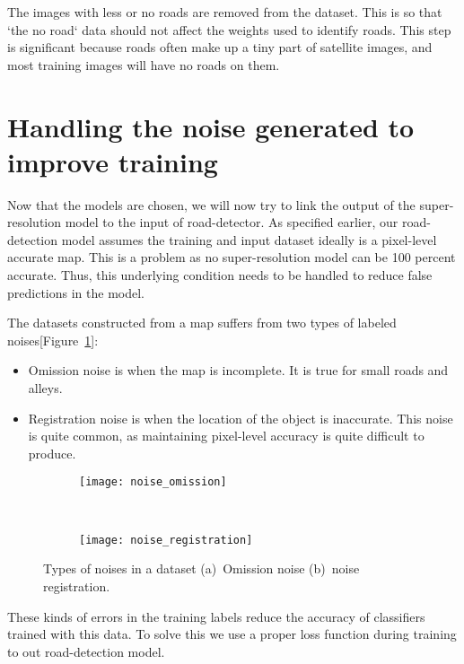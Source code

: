 The images with less or no roads are removed from the dataset. This is so that `the no road` data should not affect the weights used to identify roads. This step is significant because roads often make up a tiny part of satellite images, and most training images will have no roads on them.




\section{Handling the noise generated to improve training}
Now that the models are chosen, we will now try to link the output of the super-resolution model to the input of road-detector. As specified earlier, our road-detection model assumes the training and input dataset ideally is a pixel-level accurate map. This is a problem as no super-resolution model can be 100 percent accurate. Thus, this underlying condition needs to be handled to reduce false predictions in the model.

The datasets constructed from a map suffers from two types of labeled noises[Figure~\ref{fig:noise_types}]:
\begin{itemize}
  \item Omission noise is when the map is incomplete. It is true for small roads and alleys.
  \item Registration noise is when the location of the object is inaccurate. This noise is quite common, as maintaining pixel-level accuracy is quite difficult to produce.
\end{itemize}

\begin{figure}
  \centering
  \begin{subfigure}{0.63\textwidth}
    \texttt{[image: noise\_omission]}
    \caption{}
  \end{subfigure}~
  \begin{subfigure}{0.35\textwidth}
    \texttt{[image: noise\_registration]}
    \caption{}
  \end{subfigure}
  \caption[Types of noises in a dataset]{Types of noises in a dataset (a)~Omission noise (b)~noise registration.}%
  \label{fig:noise_types}%
\end{figure}

These kinds of errors in the training labels reduce the accuracy of classifiers trained with this data. To solve this we use a proper loss function during training to out road-detection model.

